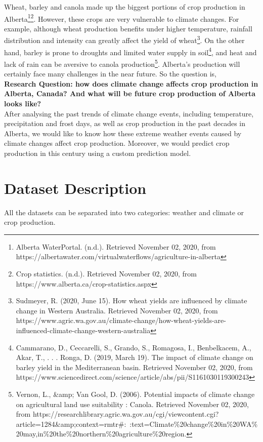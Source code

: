 \documentclass[fontsize=11pt]{article}
\begin{document}
Wheat, barley and canola made up the biggest portions of crop production in Alberta\footnote{Alberta WaterPortal. (n.d.). Retrieved November 02, 2020, from https://albertawater.com/virtualwaterflows/agriculture-in-alberta}\footnote{Crop statistics. (n.d.). Retrieved November 02, 2020, from https://www.alberta.ca/crop-statistics.aspx}. However, these crops are very vulnerable to climate changes. For example, although wheat production benefits under higher temperature, rainfall distribution and intensity can greatly affect the yield of wheat\footnote{Sudmeyer, R. (2020, June 15). How wheat yields are influenced by climate change in Western Australia. Retrieved November 02, 2020, from https://www.agric.wa.gov.au/climate-change/how-wheat-yields-are-influenced-climate-change-western-australia}. On the other hand, barley is prone to droughts and limited water supply in soil\footnote{Cammarano, D., Ceccarelli, S., Grando, S., Romagosa, I., Benbelkacem, A., Akar, T., . . . Ronga, D. (2019, March 19). The impact of climate change on barley yield in the Mediterranean basin. Retrieved November 02, 2020, from https://www.sciencedirect.com/science/article/abs/pii/S1161030119300243}, and heat and lack of rain can be aversive to canola production\footnote{Vernon, L., {\&}amp; Van Gool, D. (2006). Potential impacts of climate change on agricultural land use suitability : Canola. Retrieved November 02, 2020, from https://researchlibrary.agric.wa.gov.au/cgi/viewcontent.cgi?article=1284{\&}amp;context=rmtr#:~:text=Climate\%20change\%20in\%20WA\%20may,in\%20the\%20northern\%20agriculture\%20region.}. Alberta's production will certainly face many challenges in the near future. So the question is,\\

\textbf{Research Question: how does climate change affects crop production in Alberta, Canada? And what will be future crop production of Alberta looks like?} \\

After analysing the past trends of climate change events, including temperature, precipitation and frost days, as well as crop production in the past decades in Alberta, we would like to know how these extreme weather events caused by climate changes affect crop production. Moreover, we would predict crop production in this century using a custom prediction model.

\section*{Dataset Description}
All the datasets can be separated into two categories: weather and climate or crop production. \\	
\end{document}

